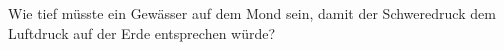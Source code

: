 Wie tief müsste ein Gewässer auf dem Mond sein, damit der Schweredruck dem Luftdruck auf der Erde entsprechen würde?
